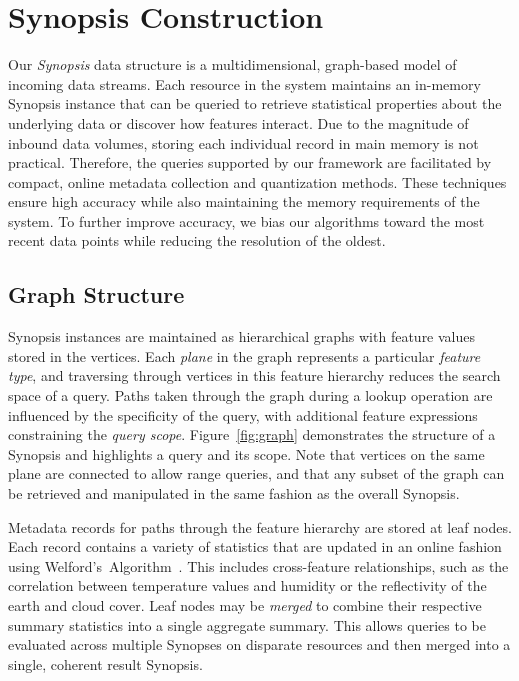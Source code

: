 \pagebreak
\section{Synopsis Construction}
\label{sec:synopsis}
Our \emph{Synopsis} data structure is a multidimensional, graph-based model of incoming data streams. Each resource in the system maintains an in-memory Synopsis instance that can be queried to retrieve statistical properties about the underlying data or discover how features interact. Due to the magnitude of inbound data volumes, storing each individual record in main memory is not practical. Therefore, the queries supported by our framework are facilitated by compact, online metadata collection and quantization methods. These techniques ensure high accuracy while also maintaining the memory requirements of the system. To further improve accuracy, we bias our algorithms toward the most recent data points while reducing the resolution of the oldest.

\subsection{Graph Structure}
Synopsis instances are maintained as hierarchical graphs with feature values stored in the vertices. Each \emph{plane} in the graph represents a particular \emph{feature type}, and traversing through vertices in this feature hierarchy reduces the search space of a query. Paths taken through the graph during a lookup operation are influenced by the specificity of the query, with additional feature expressions constraining the \emph{query scope}. Figure~\ref{fig:graph} demonstrates the structure of a Synopsis and highlights a query and its scope. Note that vertices on the same plane are connected to allow range queries, and that any subset of the graph can be retrieved and manipulated in the same fashion as the overall Synopsis.

Metadata records for paths through the feature hierarchy are stored at leaf nodes. Each record contains a variety of statistics that are updated in an online fashion using Welford's~Algorithm~\cite{welford1962note}. This includes cross-feature relationships, such as the correlation between temperature values and humidity or the reflectivity of the earth and cloud cover. Leaf nodes may be \emph{merged} to combine their respective summary statistics into a single aggregate summary. This allows queries to be evaluated across multiple Synopses on disparate resources and then merged into a single, coherent result Synopsis.

